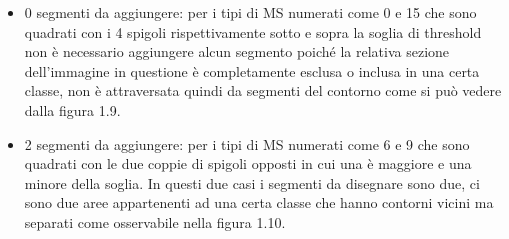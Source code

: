 \documentclass[12pt,a4paper]{report}
\begin{document}
\begin{itemize}
\item 0 segmenti da aggiungere: per i tipi di MS numerati come 0 e 15 che sono quadrati con i 4 spigoli rispettivamente sotto e sopra la soglia di threshold non è necessario aggiungere alcun segmento poiché la relativa sezione dell'immagine in questione è completamente esclusa o inclusa in una certa classe,  non è attraversata quindi da segmenti del contorno come si può vedere dalla figura 1.9.
\begin{figure}[H]
\centering
\begin{floatrow}[1]
\end{floatrow}
\end{figure}
\item 2 segmenti da aggiungere: per i tipi di MS numerati come 6 e 9 che sono quadrati con le due coppie di spigoli opposti in cui una è maggiore e una minore della soglia.  In questi due casi i segmenti da disegnare sono due,  ci sono due aree appartenenti ad una certa classe che hanno contorni vicini ma separati come osservabile nella figura 1.10.
\begin{figure}[H]
\centering
\begin{floatrow}[1]
\end{floatrow}
\end{figure}


\end{itemize}
\end{document}
